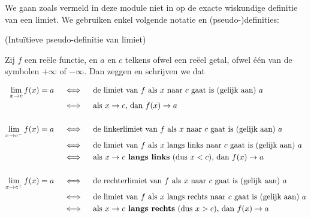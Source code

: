 \documentclass{ximera}
\begin{document}


We gaan zoals vermeld in deze module niet in op de exacte wiskundige definitie van een limiet. We gebruiken enkel volgende notatie en (pseudo-)definities:

\begin{definition} (Intuïtieve pseudo-definitie van limiet)
	
	Zij $f$ een reële functie, en $a$ en $c$ telkens ofwel een reëel getal, ofwel één van de symbolen $+\infty$ of $-\infty$. 
	Dan zeggen en schrijven we dat 

\begin{align*}
	\limxc  f(x) = a & \quad\iff\quad \text{de limiet van $f$ als $x$ naar $c$ gaat is (gelijk aan) $a$} \\
	                   & \quad\iff\quad \text{als }x\to c\text{, dan } 									f(x) \to a \\
	                   \\
	\llimxc f(x) = a & \quad\iff\quad \text{de linkerlimiet van $f$ als $x$ naar $c$ gaat is (gelijk aan) $a$} \\
	                   & \quad\iff\quad \text{de limiet van $f$ als $x$ langs links naar $c$ gaat is (gelijk aan) $a$} \\
	                   & \quad\iff\quad \text{als }x\to c\textbf{ langs links} \text{ (dus $x<c$), dan } f(x) \to a \\
	                   \\
	\rlimxc f(x) = a & \quad\iff\quad \text{de rechterlimiet van $f$ als $x$ naar $c$ gaat is (gelijk aan) $a$} \\
					   & \quad\iff\quad \text{de limiet van $f$ als $x$ langs rechts naar $c$ gaat is (gelijk aan) $a$} \\
					   & \quad\iff\quad \text{als }x\to c\textbf{ langs rechts} \text{ (dus $x>c$), dan }f(x) \to a 
\end{align*}

\end{definition}
\end{document}
